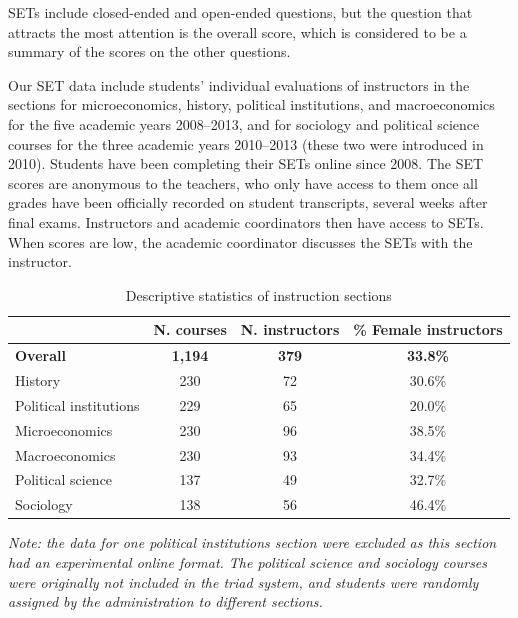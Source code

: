 \documentclass[12pt]{article}
\begin{document}
SETs include closed-ended and open-ended questions, 
but the question that attracts the most attention is the overall 
score, which is considered to be a summary 
of the scores on the other questions. 


Our SET data include students' individual evaluations of instructors in the sections for microeconomics, history, political institutions, and macroeconomics for the five academic years 2008--2013, and for sociology and political science courses for the three academic years 2010--2013 
(these two were introduced in 2010). Students have been completing their SETs online since 2008. The SET scores are
anonymous to the teachers, who only have access to them once all grades have been officially recorded on student transcripts, several weeks after final exams. Instructors and academic coordinators then have access to SETs. When scores are low, the academic coordinator discusses the SETs with the instructor.   
 


\begin{table}[htbp]
  \centering
  \footnotesize 
  \caption{Descriptive statistics of instruction sections}
    \begin{tabular}{lccc}
    \toprule 
                        & N. courses & N. instructors  & \% Female instructors  \\
   \midrule
  \textbf{Overall} &  \textbf{1,194} & \textbf{379}  &\textbf{33.8\%} \\
    History    &               230 &      72          &   30.6\% \\
    Political institutions  &  229 &      65          &   20.0\% \\    
    Microeconomics   &         230 &      96          &   38.5\% \\
    Macroeconomics   &         230 &      93          &   34.4\% \\
    Political science &       137 &      49          &   32.7\% \\
    Sociology   &              138 &      56          &   46.4\%    \\
    \bottomrule
    \end{tabular}%
 \label{tab:description}%
 
\textit{Note: the data for one political institutions section were excluded as this section had an experimental online format. The political science and sociology courses were originally not included in the triad system, and students were randomly assigned by the administration to different sections.} 

\end{table}%
\normalsize
\end{document}
